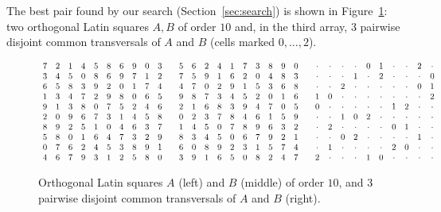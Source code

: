 \documentclass[11pt]{article}
\theoremstyle{remark}
\begin{document}
The best pair found by our search (Section~\ref{sec:search}) is shown in
Figure~\ref{fig:ourpair}: two orthogonal Latin squares $A,B$ of order $10$ and, in the
third array, 3 pairwise disjoint common transversals of $A$ and $B$ (cells marked
$0,\dots,2$).

\begin{figure}[ht]
\centering
\setlength{\arraycolsep}{2.6pt}
$\begin{array}{*{10}{c}@{\hspace{2em}}*{10}{c}@{\hspace{2em}}*{10}{c}}
7 & 2 & 1 & 4 & 5 & 8 & 6 & 9 & 0 & 3 & 5 & 6 & 2 & 4 & 1 & 7 & 3 & 8 & 9 & 0 & \cdot & \cdot & \cdot & \cdot & 0 & 1 & \cdot & \cdot & 2 & \cdot\\
3 & 4 & 5 & 0 & 8 & 6 & 9 & 7 & 1 & 2 & 7 & 5 & 9 & 1 & 6 & 2 & 0 & 4 & 8 & 3 & \cdot & \cdot & \cdot & 1 & \cdot & 2 & \cdot & \cdot & \cdot & 0\\
6 & 5 & 8 & 3 & 9 & 2 & 0 & 1 & 7 & 4 & 4 & 7 & 0 & 2 & 9 & 1 & 5 & 3 & 6 & 8 & \cdot & \cdot & 2 & \cdot & \cdot & \cdot & \cdot & \cdot & 0 & 1\\
1 & 3 & 4 & 7 & 2 & 9 & 8 & 0 & 6 & 5 & 9 & 8 & 7 & 3 & 4 & 5 & 2 & 0 & 1 & 6 & 1 & 0 & \cdot & \cdot & \cdot & \cdot & \cdot & \cdot & \cdot & 2\\
9 & 1 & 3 & 8 & 0 & 7 & 5 & 2 & 4 & 6 & 2 & 1 & 6 & 8 & 3 & 9 & 4 & 7 & 0 & 5 & 0 & \cdot & \cdot & \cdot & \cdot & \cdot & 1 & 2 & \cdot & \cdot\\
2 & 0 & 9 & 6 & 7 & 3 & 1 & 4 & 5 & 8 & 0 & 2 & 3 & 7 & 8 & 4 & 6 & 1 & 5 & 9 & \cdot & \cdot & 1 & 0 & 2 & \cdot & \cdot & \cdot & \cdot & \cdot\\
8 & 9 & 2 & 5 & 1 & 0 & 4 & 6 & 3 & 7 & 1 & 4 & 5 & 0 & 7 & 8 & 9 & 6 & 3 & 2 & \cdot & 2 & \cdot & \cdot & \cdot & \cdot & 0 & 1 & \cdot & \cdot\\
5 & 8 & 0 & 1 & 6 & 4 & 7 & 3 & 2 & 9 & 8 & 3 & 4 & 5 & 0 & 6 & 7 & 9 & 2 & 1 & \cdot & \cdot & 0 & 2 & \cdot & \cdot & \cdot & \cdot & 1 & \cdot\\
0 & 7 & 6 & 2 & 4 & 5 & 3 & 8 & 9 & 1 & 6 & 0 & 8 & 9 & 2 & 3 & 1 & 5 & 7 & 4 & \cdot & 1 & \cdot & \cdot & \cdot & \cdot & 2 & 0 & \cdot & \cdot\\
4 & 6 & 7 & 9 & 3 & 1 & 2 & 5 & 8 & 0 & 3 & 9 & 1 & 6 & 5 & 0 & 8 & 2 & 4 & 7 & 2 & \cdot & \cdot & \cdot & 1 & 0 & \cdot & \cdot & \cdot & \cdot\\
\end{array}$
\caption{Orthogonal Latin squares $A$ (left) and $B$ (middle) of order $10$, and 3
pairwise disjoint common transversals of $A$ and $B$ (right).}
\label{fig:ourpair}
\end{figure}
\end{document}
